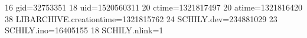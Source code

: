 16 gid=32753351
18 uid=1520560311
20 ctime=1321817497
20 atime=1321816420
38 LIBARCHIVE.creationtime=1321815762
24 SCHILY.dev=234881029
23 SCHILY.ino=16405155
18 SCHILY.nlink=1
